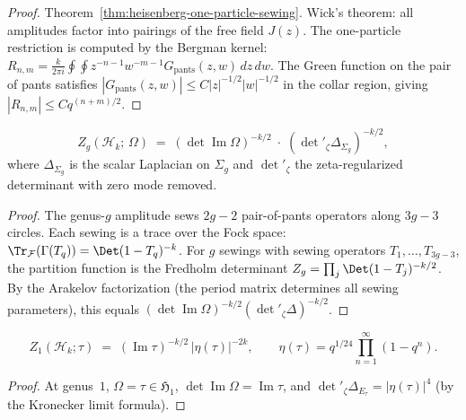 \begin{proof}
Theorem~\ref{thm:heisenberg-one-particle-sewing}.
Wick's theorem: all amplitudes factor into pairings of the free
field $J(z)$.  The one-particle restriction is computed by the
Bergman kernel:
$R_{n,m} = \frac{k}{2\pi i}\oint \oint z^{-n-1}w^{-m-1}
G_{\mathrm{pants}}(z,w)\,dz\,dw$.
The Green function on the pair of pants satisfies
$|G_{\mathrm{pants}}(z,w)| \leq C|z|^{-1/2}|w|^{-1/2}$ in the
collar region, giving $|R_{n,m}| \leq Cq^{(n+m)/2}$.
\end{proof}

\begin{theorem}%
\label{thm:g1-heisenberg-zg}%
%
%
\begin{equation}\label{eq:g1-heisenberg-zg}
Z_g(\mathcal{H}_k;\,\Omega)
\;=\;
(\det\operatorname{Im}\Omega)^{-k/2}
\;\cdot\;
(\det{}'_\zeta \Delta_{\Sigma_g})^{-k/2},
\end{equation}
where $\Delta_{\Sigma_g}$ is the scalar Laplacian on $\Sigma_g$
and $\det{}'_\zeta$ the zeta-regularized determinant with zero
mode removed.
\end{theorem}

\begin{proof}
The genus-$g$ amplitude sews $2g - 2$ pair-of-pants operators
along $3g - 3$ circles.  Each sewing is a trace over the Fock
space: $\Tr_{\mathcal{F}}(\Gamma(T_q)) =
\Det(1 - T_q)^{-k}$.  For $g$ sewings with sewing operators
$T_1, \ldots, T_{3g-3}$, the partition function is the
Fredholm determinant
$Z_g = \prod_j \Det(1 - T_j)^{-k/2}$.  By the Arakelov
factorization (the period matrix determines all sewing
parameters), this equals
$(\det\operatorname{Im}\Omega)^{-k/2}
(\det{}'_\zeta\Delta)^{-k/2}$.
\end{proof}

\begin{corollary}%
\label{cor:g1-heisenberg-genus1}%
%
\begin{equation}\label{eq:g1-heisenberg-z1}
Z_1(\mathcal{H}_k;\tau)
\;=\;
(\operatorname{Im}\tau)^{-k/2}
\,|\eta(\tau)|^{-2k},
\qquad
\eta(\tau) = q^{1/24}\prod_{n=1}^\infty(1-q^n).
\end{equation}
\end{corollary}

\begin{proof}
At genus~$1$, $\Omega = \tau \in \mathfrak{H}_1$,
$\det\operatorname{Im}\Omega = \operatorname{Im}\tau$, and
$\det'_\zeta\Delta_{E_\tau} = |\eta(\tau)|^4$ (by the
Kronecker limit formula).
\end{proof}

